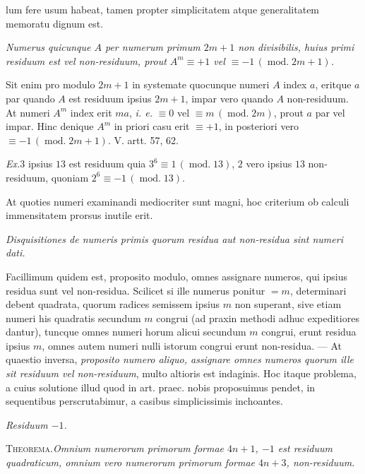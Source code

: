 lum fere usum habeat, tamen propter simplicitatem atque generalitatem memoratu dignum est.

\emph{Numerus quicunque $A$ per numerum primum $2m+1$ non divisibilis, huius primi residuum est vel non-residuum, prout $A^m\equiv+1$ vel $\equiv-1\,(\operatorname{mod.}2m+1)$.}

Sit enim pro modulo $2m+1$ in systemate quocunque numeri $A$ index $a$, eritque $a$ par quando $A$ est residuum ipsius $2m+1$, impar vero quando $A$ non-residuum. At numeri $A^m$ index erit $ma$, \emph{i. e.} $\equiv0$ vel $\equiv m\,(\operatorname{mod.}2m)$, prout $a$ par vel impar. Hinc denique $A^m$ in priori casu erit $\equiv+1$, in posteriori vero $\equiv-1\,(\operatorname{mod.}2m+1)$. V. artt. 57, 62.

\emph{Ex.}\quad $3$ ipsius $13$ est residuum quia $3^6\equiv1\,(\operatorname{mod.}13)$, $2$ vero ipsius $13$ non-residuum, quoniam $2^6\equiv-1\,(\operatorname{mod.}13)$.

At quoties numeri examinandi mediocriter sunt magni, hoc criterium ob calculi immensitatem prorsus inutile erit.

\begin{center}\emph{Disquisitiones de numeris primis quorum residua aut non-residua sint numeri dati.}\end{center}

Facillimum quidem est, proposito modulo, omnes assignare numeros, qui ipsius residua sunt vel non-residua. Scilicet si ille numerus ponitur $=m$, determinari debent quadrata, quorum radices semissem ipsius $m$ non superant, sive etiam numeri his quadratis secundum $m$ congrui (ad praxin methodi adhuc expeditiores dantur), tuncque omnes numeri horum alicui secundum $m$ congrui, erunt residua ipsius $m$, omnes autem numeri nulli istorum congrui erunt non-residua. --- At quaestio inversa, \emph{proposito numero aliquo, assignare omnes numeros quorum ille sit residuum vel non-residuum}, multo altioris est indaginis. Hoc itaque problema, a cuius solutione illud quod in art. praec. nobis proposuimus pendet, in sequentibus perscrutabimur, a casibus simplicissimis inchoantes.

\begin{center}\emph{Residuum $-1$.}\end{center}

\textsc{Theorema.}\quad \emph{Omnium numerorum primorum formae $4n+1$, $-1$ est residuum quadraticum, omnium vero numerorum primorum formae $4n+3$, non-residuum.}

